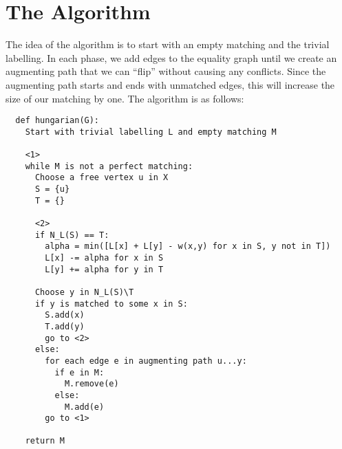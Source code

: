 \documentclass[12pt]{article}
\begin{document}
\section*{The Algorithm}
The idea of the algorithm is to start with an empty matching and the trivial labelling. In each phase, we add edges to the equality graph until we create an augmenting path that we can ``flip'' without causing any conflicts. Since the augmenting path starts and ends with unmatched edges, this will increase the size of our matching by one. The algorithm is as follows:

\begin{verbatim}
  def hungarian(G):
    Start with trivial labelling L and empty matching M

    <1>
    while M is not a perfect matching:
      Choose a free vertex u in X
      S = {u}
      T = {}

      <2>
      if N_L(S) == T:
        alpha = min([L[x] + L[y] - w(x,y) for x in S, y not in T])
        L[x] -= alpha for x in S
        L[y] += alpha for y in T

      Choose y in N_L(S)\T
      if y is matched to some x in S:
        S.add(x)
        T.add(y)
        go to <2>
      else:
        for each edge e in augmenting path u...y:
          if e in M:
            M.remove(e)
          else:
            M.add(e)
        go to <1>

    return M
\end{verbatim}
\end{document}
